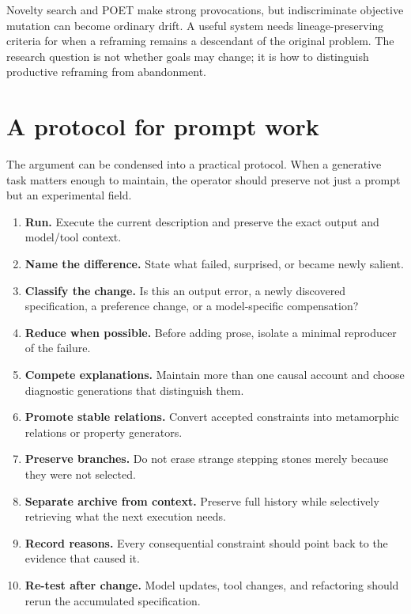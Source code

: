 \documentclass[11pt]{article}
\begin{document}
Novelty search and POET make strong provocations, but indiscriminate objective mutation can become ordinary drift. A useful system needs lineage-preserving criteria for when a reframing remains a descendant of the original problem. The research question is not whether goals may change; it is how to distinguish productive reframing from abandonment.

\section{A protocol for prompt work}

The argument can be condensed into a practical protocol. When a generative task matters enough to maintain, the operator should preserve not just a prompt but an experimental field.

\begin{enumerate}
  \item \textbf{Run.} Execute the current description and preserve the exact output and model/tool context.
  \item \textbf{Name the difference.} State what failed, surprised, or became newly salient.
  \item \textbf{Classify the change.} Is this an output error, a newly discovered specification, a preference change, or a model-specific compensation?
  \item \textbf{Reduce when possible.} Before adding prose, isolate a minimal reproducer of the failure.
  \item \textbf{Compete explanations.} Maintain more than one causal account and choose diagnostic generations that distinguish them.
  \item \textbf{Promote stable relations.} Convert accepted constraints into metamorphic relations or property generators.
  \item \textbf{Preserve branches.} Do not erase strange stepping stones merely because they were not selected.
  \item \textbf{Separate archive from context.} Preserve full history while selectively retrieving what the next execution needs.
  \item \textbf{Record reasons.} Every consequential constraint should point back to the evidence that caused it.
  \item \textbf{Re-test after change.} Model updates, tool changes, and refactoring should rerun the accumulated specification.
\end{enumerate}
\end{document}
